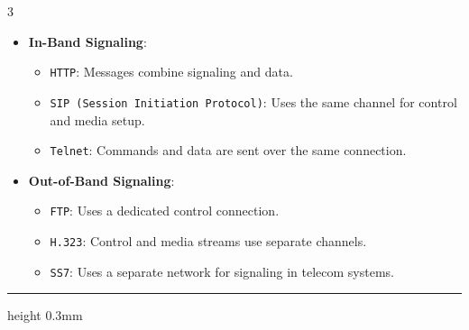 \documentclass[10pt,landscape]{article}
\begin{document}
\begin{multicols}{3}
\begin{itemize}
    \setlength{\itemsep}{0pt}
    \item \textbf{In-Band Signaling}:  
        \begin{itemize}
            \setlength{\itemsep}{0pt}
            \item \texttt{HTTP}: Messages combine signaling and data.  
            \item \texttt{SIP (Session Initiation Protocol)}: Uses the same channel for control and media setup.  
            \item \texttt{Telnet}: Commands and data are sent over the same connection.  
        \end{itemize}
    \item \textbf{Out-of-Band Signaling}:  
        \begin{itemize}
            \setlength{\itemsep}{0pt}
            \item \texttt{FTP}: Uses a dedicated control connection.  
            \item \texttt{H.323}: Control and media streams use separate channels.  
            \item \texttt{SS7}: Uses a separate network for signaling in telecom systems.  
        \end{itemize}
\end{itemize}


\hrule height 0.3mm 


\end{multicols}
\end{document}
